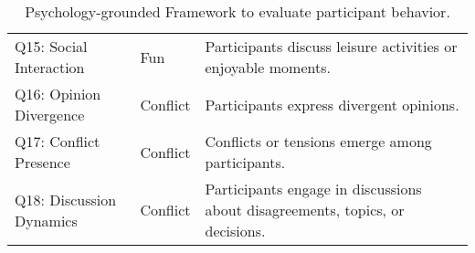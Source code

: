 \begin{table*}[ht]
\begin{tabular}{lll}
    Q15: Social Interaction     & \cellcolor{pastelPink}Fun         & Participants discuss leisure activities or enjoyable moments. \\
    Q16: Opinion Divergence     & \cellcolor{pastelOrange}Conflict  & Participants express divergent opinions. \\
    Q17: Conflict Presence      & \cellcolor{pastelOrange}Conflict  & Conflicts or tensions emerge among participants. \\
    Q18: Discussion Dynamics    & \cellcolor{pastelOrange}Conflict  & Participants engage in discussions about disagreements, topics, or decisions. \\
    \bottomrule
  \end{tabular}
  \caption{Psychology-grounded Framework to evaluate participant behavior.}
  \label{tab:appendix_behavior_questions}
\end{table*}



